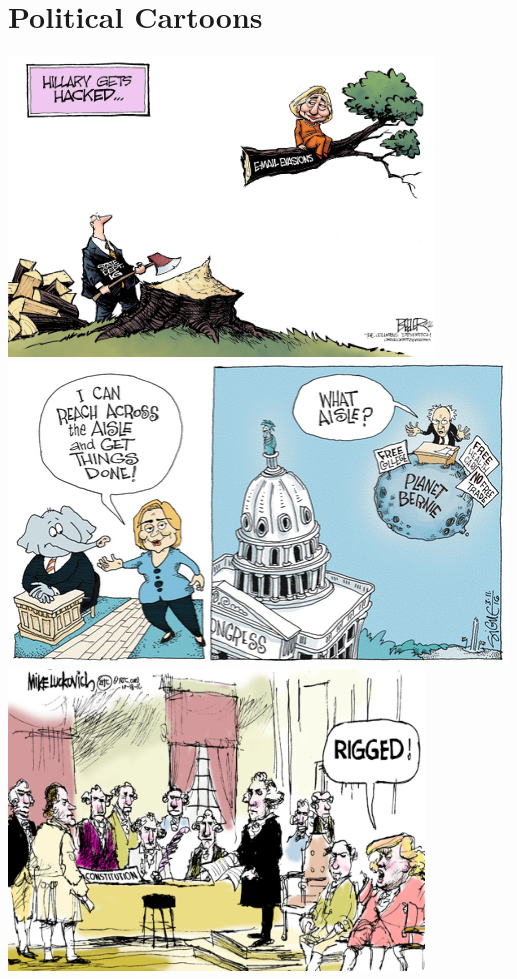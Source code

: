 \documentclass[twoside]{article}
\begin{document}
              \section{Political Cartoons}
              {
              \centering\vskip2cm
              \includegraphics[width=\textwidth,height=8cm,keepaspectratio]{images/cartoons/hacked.jpg}\vfill
              \includegraphics[width=\textwidth,height=8cm,keepaspectratio]{images/cartoons/aisle.jpg}\vfill\newpage
              \includegraphics[width=\textwidth,height=8cm,keepaspectratio]{images/cartoons/rigged.jpg}\\
              }
\end{document}
